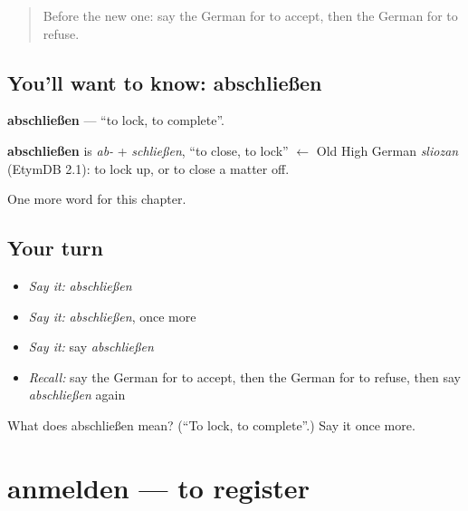 \label{lesson:GE-C244-abschliessen}



\begin{quote}
Before the new one: say the German for to accept, then the German for to refuse.
\end{quote}

\subsection*{You'll want to know: abschließen}
\textbf{abschließen} — \textquotedblleft{}to lock, to complete\textquotedblright{}.

\begin{cousinweb}
\textbf{abschließen} is \emph{ab-} + \emph{schließen}, \textquotedblleft{}to close, to lock\textquotedblright{} $\leftarrow$ Old High German \emph{sliozan} (EtymDB 2.1): to lock up, or to close a matter off.
\end{cousinweb}

\begin{grammarlens}[title={What you've built}]
One more word for this chapter.
\end{grammarlens}

\subsection*{Your turn}
\begin{itemize}
\raggedright
  \item \emph{Say it:} \emph{abschließen}
  \item \emph{Say it:} \emph{abschließen}, once more
  \item \emph{Say it:} say \emph{abschließen}
  \item \emph{Recall:} say the German for to accept, then the German for to refuse, then say \emph{abschließen} again
\end{itemize}

\begin{tcolorbox}[breakable,colback=teal!4,colframe=teal!35!black,title={Before you move on}]
What does abschließen mean? (\textquotedblleft{}To lock, to complete\textquotedblright{}.) Say it once more.
\end{tcolorbox}
\section[anmelden]{anmelden — to register}

\label{lesson:GE-C244-anmelden}



